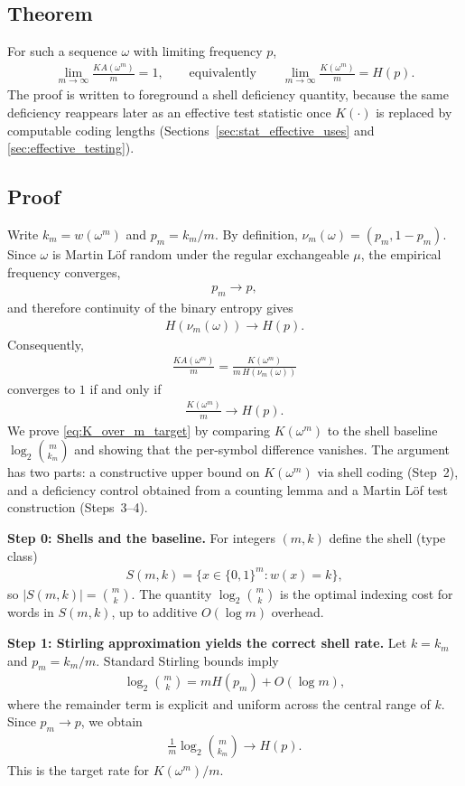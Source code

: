 \documentclass[12pt]{article}
\newcommand{\be}{\begin{eqnarray}}
\newcommand{\ee}{\end{eqnarray}}
\begin{document}
\subsection*{Theorem}
\label{sec:KA_theorem}

For such a sequence $\omega$ with limiting frequency $p$,
\be
\lim_{m\to\infty}\frac{KA(\omega^{m})}{m}=1,
\qquad\text{equivalently}\qquad
\lim_{m\to\infty}\frac{K(\omega^{m})}{m}=H(p).
\label{eq:main_theorem_statement}
\ee
The proof is written to foreground a shell deficiency quantity, because the same deficiency reappears later as an effective test statistic once $K(\cdot)$ is replaced by computable coding lengths (Sections~\ref{sec:stat_effective_uses} and \ref{sec:effective_testing}).

\subsection*{Proof}
\label{sec:KA_theorem_proof}

Write $k_m=w(\omega^{m})$ and $p_m=k_m/m$. By definition, $\nu_m(\omega)=(p_m,1-p_m)$.
Since $\omega$ is Martin L\"of random under the regular exchangeable $\mu$, the empirical frequency converges,
\be
p_m\to p,
\label{eq:pm_to_p}
\ee
and therefore continuity of the binary entropy gives
\be
H(\nu_m(\omega)) \to H(p).
\label{eq:Hpm_to_Hp}
\ee
Consequently,
\be
\frac{KA(\omega^{m})}{m}
=
\frac{K(\omega^{m})}{m\,H(\nu_m(\omega))}
\label{eq:KA_over_m_ratio}
\ee
converges to $1$ if and only if
\be
\frac{K(\omega^{m})}{m}\to H(p).
\label{eq:K_over_m_target}
\ee
We prove \eqref{eq:K_over_m_target} by comparing $K(\omega^{m})$ to the shell baseline $\log_2\binom{m}{k_m}$ and showing that the per-symbol difference vanishes. The argument has two parts: a constructive upper bound on $K(\omega^{m})$ via shell coding (Step~2), and a deficiency control obtained from a counting lemma and a Martin L\"of test construction (Steps~3--4).

\medskip
\noindent
{\bf Step 0: Shells and the baseline.}
For integers $(m,k)$ define the shell (type class)
\be
S(m,k)=\{x\in\{0,1\}^{m}:w(x)=k\},
\label{eq:shell_def}
\ee
so $|S(m,k)|=\binom{m}{k}$. The quantity $\log_2\binom{m}{k}$ is the optimal indexing cost for words in $S(m,k)$, up to additive  $O(\log m)$ overhead.

\medskip
\noindent
{\bf Step 1: Stirling approximation yields the correct shell rate.}
Let $k=k_m$ and $p_m=k_m/m$. Standard Stirling bounds imply
\be
\log_2\binom{m}{k}
=
mH(p_m) + O(\log m),
\label{eq:stirling_shell}
\ee
where the remainder term is explicit and uniform across the central range of $k$.
Since $p_m\to p$, we obtain
\be
\frac{1}{m}\log_2\binom{m}{k_m} \to H(p).
\label{eq:shell_rate_to_entropy}
\ee
This is the target rate for $K(\omega^{m})/m$.
\end{document}
